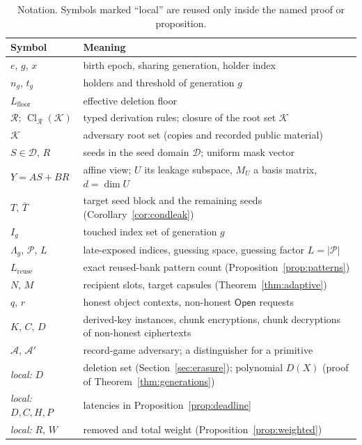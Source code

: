 \documentclass[pdflatex,sn-mathphys-num,twocolumn]{sn-jnl}
\theoremstyle{plain}
\theoremstyle{definition}
\newcommand{\Cl}{\operatorname{Cl}}
\begin{document}
\begin{table}[htbp]
\caption{Notation. Symbols marked ``local'' are reused only inside the named proof or proposition.}\label{tab:notation}
\centering\footnotesize
\begin{tabularx}{\linewidth}{@{}>{\raggedright\arraybackslash}p{.27\linewidth}Y@{}}\toprule
Symbol & Meaning\\\midrule
$e$, $g$, $x$ & birth epoch, sharing generation, holder index\\
$n_g$, $t_g$ & holders and threshold of generation $g$\\
$L_{\mathrm{floor}}$ & effective deletion floor\\
$\mathcal R$; $\Cl_{\mathcal R}(\mathcal K)$ & typed derivation rules; closure of the root set $\mathcal K$\\
$\mathcal K$ & adversary root set (copies and recorded public material)\\
$S\in\mathcal D$, $R$ & seeds in the seed domain $\mathcal D$; uniform mask vector\\
$Y=AS+BR$ & affine view; $U$ its leakage subspace, $M_U$ a basis matrix, $d=\dim U$\\
$T$, $\bar T$ & target seed block and the remaining seeds (Corollary~\ref{cor:condleak})\\
$I_g$ & touched index set of generation $g$\\
$\Lambda_g$, $\mathcal P$, $L$ & late-exposed indices, guessing space, guessing factor $L=|\mathcal P|$\\
$L_{\mathrm{reuse}}$ & exact reused-bank pattern count (Proposition~\ref{prop:patterns})\\
$N$, $M$ & recipient slots, target capsules (Theorem~\ref{thm:adaptive})\\
$q$, $r$ & honest object contexts, non-honest $\mathsf{Open}$ requests\\
$K$, $C$, $D$ & derived-key instances, chunk encryptions, chunk decryptions of non-honest ciphertexts\\
$\mathcal A$, $\mathcal A'$ & record-game adversary; a distinguisher for a primitive\\
\emph{local:} $D$ & deletion set (Section~\ref{sec:erasure}); polynomial $D(X)$ (proof of Theorem~\ref{thm:generations})\\
\emph{local:} $D,C,H,P$ & latencies in Proposition~\ref{prop:deadline}\\
\emph{local:} $R$, $W$ & removed and total weight (Proposition~\ref{prop:weighted})\\\bottomrule
\end{tabularx}
\end{table}
\end{document}
